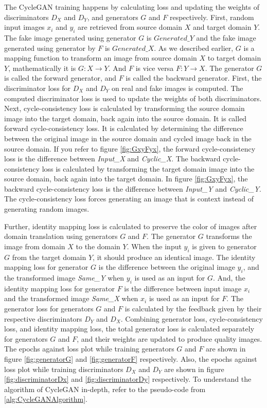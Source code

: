 The \ac{CycleGAN} training happens by calculating loss and updating the weights of discriminators $D_X$ and $D_Y$, and generators $G$ and $F$ respectively. First, random input images $x_i$ and $y_i$ are retrieved from source domain $X$ and target domain $Y$. The fake image generated using generator $G$ is $Generated\_Y$ and the fake image generated using generator by $F$ is $Generated\_X$. As we described earlier, $G$ is a mapping function to transform an image from source domain $X$ to target domain $Y$, mathematically it is $G: X \rightarrow Y$. And $F$ is vice versa $F: Y \rightarrow X$. The generator $G$ is called the forward generator, and $F$ is called the backward generator. First, the discriminator loss for $D_X$ and $D_Y$ on real and fake images is computed. The computed discriminator loss is used to update the weights of both discriminators. Next, cycle-consistency loss is calculated by transforming the source domain image into the target domain, back again into the source domain. It is called forward cycle-consistency loss. It is calculated by determining the difference between the original image in the source domain and cycled image back in the source domain. If you refer to figure \ref{fig:GxyFyx}, the forward cycle-consistency loss is the difference between \textit{Input\_X} and \textit{Cyclic\_X}. The backward cycle-consistency loss is calculated by transforming the target domain image into the source domain, back again into the target domain. In figure \ref{fig:GxyFyx}, the backward cycle-consistency loss is the difference between \textit{Input\_Y} and \textit{Cyclic\_Y}. The cycle-consistency loss forces generating an image that is context instead of generating random images.

Further, identity mapping loss is calculated to preserve the color of images after domain translation using generators $G$ and $F$. The generator $G$ transforms the image from domain $X$ to the domain $Y$. When the input $y_i$ is given to generator $G$ from the target domain $Y$, it should produce an identical image. The identity mapping loss for generator $G$ is the difference between the original image $y_i$, and the transformed image \textit{Same\_Y} when $y_i$ is used as an input for $G$. And, the identity mapping loss for generator $F$ is the difference between input image $x_i$ and the transformed image \textit{Same\_X} when $x_i$ is used as an input for $F$. The generator loss for generators $G$ and $F$ is calculated by the feedback given by their respective discriminators $D_Y$ and $D_X$. Combining generator loss, cycle-consistency loss, and identity mapping loss, the total generator loss is calculated separately for generators $G$ and $F$, and their weights are updated to produce quality images. The epochs against loss plot while training generators $G$ and $F$ are shown in figure \ref{fig:generatorG} and \ref{fig:generatorF} respectively. Also, the epochs against loss plot while training discriminators $D_X$ and $D_Y$ are shown in figure \ref{fig:discriminatorDx} and \ref{fig:discriminatorDy} respectively. To understand the algorithm of \ac{CycleGAN} in-depth, refer to the pseudo-code from \ref{alg:CycleGANAlgorithm}.



